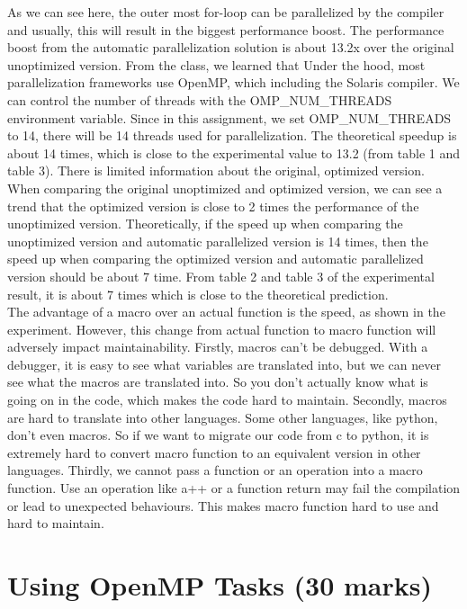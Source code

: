 \documentclass[12pt]{article}
\begin{document}
\indent
As we can see here, the outer most for-loop can be parallelized by the compiler and usually, this will result in the biggest performance boost. The performance boost from the automatic parallelization solution is about 13.2x over the original unoptimized version. From the class, we learned that Under the hood, most parallelization frameworks use OpenMP, which including the Solaris compiler. We can control the number of threads with the OMP\_NUM\_THREADS environment variable. Since in this assignment, we set OMP\_NUM\_THREADS to 14, there will be 14 threads used for parallelization. The theoretical speedup is about 14 times, which is close to the experimental value to 13.2 (from table 1 and table 3). There is limited information about the original, optimized version. When comparing the original unoptimized and optimized version, we can see a trend that the optimized version is close to 2 times the performance of the unoptimized version. Theoretically, if the speed up when comparing the unoptimized version and automatic parallelized version is 14 times, then the speed up when comparing the optimized version and automatic parallelized version should be about 7 time. From table 2 and table 3 of the experimental result, it is about 7 times which is close to the theoretical prediction.\\

\indent
The advantage of a macro over an actual function is the speed, as shown in the experiment. However, this change from actual function to macro function will adversely impact maintainability. Firstly, macros can't be debugged. With a debugger, it is easy to see what variables are translated into, but we can never see what the macros are translated into. So you don't actually know what is going on in the code, which makes the code hard to maintain. Secondly, macros are hard to translate into other languages. Some other languages, like python, don't even macros. So if we want to migrate our code from c to python, it is extremely hard to convert macro function to an equivalent version in other languages. Thirdly, we cannot pass a function or an operation into a macro function. Use an operation like a++ or a function return may fail the compilation or lead to unexpected behaviours. This makes macro function hard to use and hard to maintain.

\newpage
\section*{Using OpenMP Tasks (30 marks)}
\end{document}
